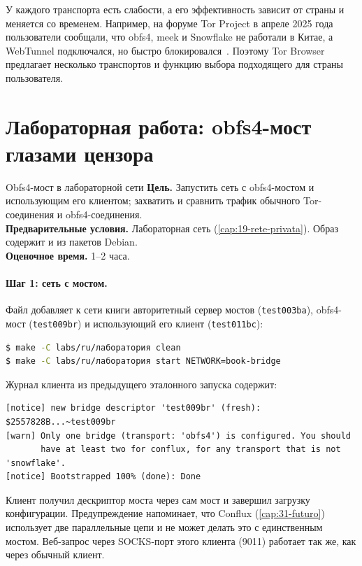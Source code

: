 \begin{attenzione}
У каждого транспорта есть слабости, а его эффективность зависит от страны и меняется со временем. Например, на форуме Tor Project в апреле 2025 года пользователи сообщали, что obfs4, meek и Snowflake не работали в Китае, а WebTunnel подключался, но быстро блокировался~\cite{forumcina2025}. Поэтому Tor Browser предлагает несколько транспортов и функцию выбора подходящего для страны пользователя.
\end{attenzione}

\section{Лабораторная работа: obfs4-мост глазами цензора}\label{sec:lab-censura}

\begin{laboratorio}[10]{Obfs4-мост в лабораторной сети}
\textbf{Цель.} Запустить сеть с obfs4-мостом и использующим его клиентом; захватить и сравнить трафик обычного Tor-соединения и obfs4-соединения.\\
\textbf{Предварительные условия.} Лабораторная сеть (\cref{cap:19-rete-privata}). Образ содержит  и  из пакетов Debian.\\
\textbf{Оценочное время.} 1--2 часа.
\end{laboratorio}

\paragraph{Шаг 1: сеть с мостом.} Файл  добавляет к сети книги авторитетный сервер мостов (\texttt{test003ba}), obfs4-мост (\texttt{test009br}) и использующий его клиент (\texttt{test011bc}):
\begin{lstlisting}[language=bash,numbers=none]
$ make -C labs/ru/лаборатория clean
$ make -C labs/ru/лаборатория start NETWORK=book-bridge
\end{lstlisting}
Журнал клиента из предыдущего эталонного запуска содержит:
\begin{lstlisting}[numbers=none]
[notice] new bridge descriptor 'test009br' (fresh): $2557828B...~test009br
[warn] Only one bridge (transport: 'obfs4') is configured. You should
       have at least two for conflux, for any transport that is not 'snowflake'.
[notice] Bootstrapped 100% (done): Done
\end{lstlisting}
Клиент получил дескриптор моста через сам мост и завершил загрузку конфигурации. Предупреждение напоминает, что Conflux (\cref{cap:31-futuro}) использует две параллельные цепи и не может делать это с единственным мостом. Веб-запрос через SOCKS-порт этого клиента (9011) работает так же, как через обычный клиент.


